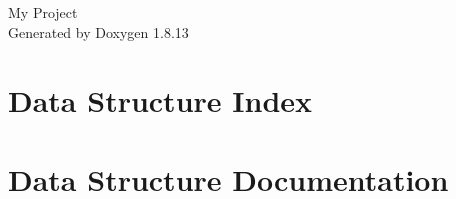 \documentclass[twoside]{book}
\newcommand{\+}{\discretionary{\mbox{\scriptsize$\hookleftarrow$}}{}{}}
\newcommand{\clearemptydoublepage}{%
  \newpage{\pagestyle{empty}\cleardoublepage}%
}
\begin{document}
\begin{titlepage}
\vspace*{7cm}
\begin{center}%
{\Large My Project }\\
\vspace*{1cm}
{\large Generated by Doxygen 1.8.13}\\
\end{center}
\end{titlepage}
\clearemptydoublepage
{}
\tableofcontents
\clearemptydoublepage
{}

\chapter{Data Structure Index}

\chapter{Data Structure Documentation}



\backmatter
\newpage
{}
\clearemptydoublepage
{}
\printindex
\end{document}
